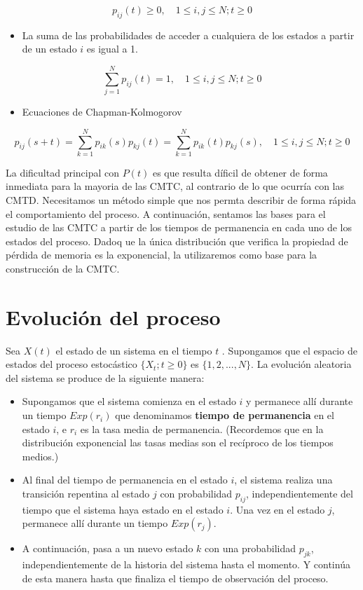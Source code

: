 \documentclass[
]{book}
\providecommand{\tightlist}{%
  \setlength{\itemsep}{0pt}\setlength{\parskip}{0pt}}
\theoremstyle{definition}
\theoremstyle{definition}
\theoremstyle{definition}
\theoremstyle{definition}
\theoremstyle{remark}
\begin{document}
\[p_{ij}(t) \geq 0, \quad  1 \leq i, j \leq N; t \geq 0\]

\begin{itemize}
\tightlist
\item
  La suma de las probabilidades de acceder a cualquiera de los estados a partir de un estado \(i\) es igual a 1.
\end{itemize}

\[\sum_{j=1}^N p_{ij}(t) = 1, \quad  1 \leq i, j \leq N; t \geq 0\]

\begin{itemize}
\tightlist
\item
  Ecuaciones de Chapman-Kolmogorov
\end{itemize}

\[p_{ij}(s+t) =  \sum_{k=1}^N p_{ik}(s)p_{kj}(t) =  \sum_{k=1}^N p_{ik}(t)p_{kj}(s)   , \quad  1 \leq i, j \leq N; t \geq 0\]

La dificultad principal con \(P(t)\) es que resulta díficil de obtener de forma inmediata para la mayoria de las CMTC, al contrario de lo que ocurría con las CMTD. Necesitamos un método simple que nos permta describir de forma rápida el comportamiento del proceso. A continuación, sentamos las bases para el estudio de las CMTC a partir de los tiempos de permanencia en cada uno de los estados del proceso. Dadoq ue la única distribución que verifica la propiedad de pérdida de memoria es la exponencial, la utilizaremos como base para la construcción de la CMTC.

\hypertarget{CMTCA}{%
\section{Evolución del proceso}\label{CMTCA}}

Sea \(X(t)\) el estado de un sistema en el tiempo \(t\) . Supongamos que el espacio de estados del proceso estocástico \(\{X_t; t \geq 0\}\) es \(\{1, 2,...,N\}\). La evolución aleatoria del sistema se produce de la siguiente manera:

\begin{itemize}
\item
  Supongamos que el sistema comienza en el estado \(i\) y permanece allí durante un tiempo \(Exp(r_i)\) que denominamos \textbf{tiempo de permanencia} en el estado \(i\), e \(r_i\) es la tasa media de permanencia. (Recordemos que en la distribución exponencial las tasas medias son el recíproco de los tiempos medios.)
\item
  Al final del tiempo de permanencia en el estado \(i\), el sistema realiza una transición repentina al estado \(j\) con probabilidad \(p_{ij}\), independientemente del tiempo que el sistema haya estado en el estado \(i\). Una vez en el estado \(j\), permanece allí durante un tiempo \(Exp(r_j)\).
\item
  A continuación, pasa a un nuevo estado \(k\) con una probabilidad \(p_{jk}\), independientemente de la historia del sistema hasta el momento. Y continúa de esta manera hasta que finaliza el tiempo de observación del proceso.
\end{itemize}
\end{document}
